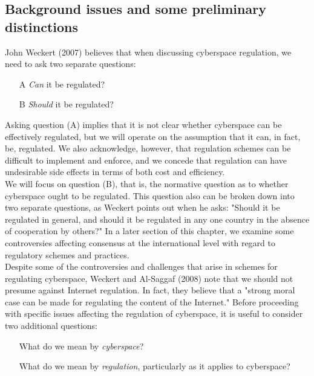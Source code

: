 \documentclass[12pt]{article}
\theoremstyle{definition}
\begin{document}
\subsection{Background issues and some preliminary distinctions}
John Weckert (2007) believes that when discussing cyberspace regulation, we need to ask
two separate questions:
\begin{itemize}
\item[A] \textit{Can} it be regulated?
\item[B] \textit{Should} it be regulated?
\end{itemize}
Asking question (A) implies that it is not clear whether cyberspace can be effectively
regulated, but we will operate on the assumption that it can, in fact, be, regulated. We also
acknowledge, however, that regulation schemes can be difficult to implement and
enforce, and we concede that regulation can have undesirable side effects in terms of
both cost and efficiency.\\
We will focus on question (B), that is, the normative question as
to whether cyberspace ought to be regulated. This question also can be broken down into
two separate questions, as Weckert points out when he asks: "Should it be regulated in
general, and should it be regulated in any one country in the absence of cooperation by
others?" In a later section of this chapter, we examine some controversies affecting
consensus at the international level with regard to regulatory schemes and practices.\\
Despite some of the controversies and challenges that arise in schemes for regulating
cyberspace, Weckert and Al-Saggaf (2008) note that we should not presume against
Internet regulation. In fact, they believe that a "strong moral case can be made for
regulating the content of the Internet." Before proceeding with specific issues affecting
the regulation of cyberspace, it is useful to consider two additional questions:
\begin{itemize}
\item[] What do we mean by \textit{cyberspace}?
\item[] What do we mean by \textit{regulation}, particularly as it applies to cyberspace?
\end{itemize}
\end{document}
